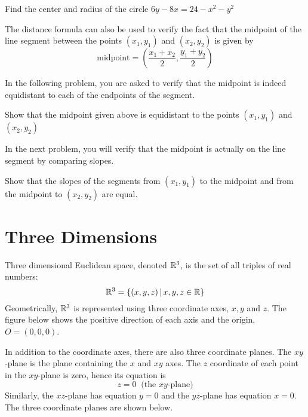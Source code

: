 \documentclass[handout]{ximera}
\begin{document}
\begin{problem}
Find the center and radius of the circle $6y - 8x= 24 -x^2 - y^2$\\
\end{problem}

The distance formula can also be used to verify the fact that the midpoint of the line segment between the points 
$(x_1,y_1)$ and $(x_2, y_2)$ is given by
\[
\text{midpoint} = \left(\frac{x_1+x_2}{2}, \frac{y_1+y_2}{2}\right)
\]

In the following problem, you are asked to verify that the midpoint is indeed equidistant to each of the endpoints of the segment.
\begin{problem}
Show that the midpoint given above is equidistant to the points $(x_1, y_1)$ and $(x_2, y_2)$
\end{problem}
In the next problem, you will verify that the midpoint is actually on the line segment by comparing slopes.
\begin{problem}
Show that the slopes of the segments from $(x_1, y_1)$ to the midpoint and from the midpoint to $(x_2, y_2)$ are equal.
\end{problem}

\section{Three Dimensions}
Three dimensional Euclidean space, denoted $\mathbb R^3$, is the set of all triples of real numbers:
\[
\mathbb R^3 = \{(x,y,z)\,|\, x,y,z \in \mathbb R \}
\]
Geometrically, $\mathbb R^3$ is represented using three coordinate axes, $x, y$ and $z$.
The figure below shows the positive direction of each axis and the origin, $O = (0,0,0)$.
\begin{image}
\end{image}
In addition to the coordinate axes, there are also three coordinate planes.  
The $xy$-plane is the plane containing the $x$ and $xy$ axes.  
The $z$ coordinate of each point in the $xy$-plane is zero, hence its equation is
\[
z = 0 \;\; \text{(the $xy$-plane)}
\]
Similarly, the $xz$-plane has equation $y = 0$ and the $yz$-plane has equation $x=0$.
The three coordinate planes are shown below.
\begin{image}
\end{image}
\end{document}
